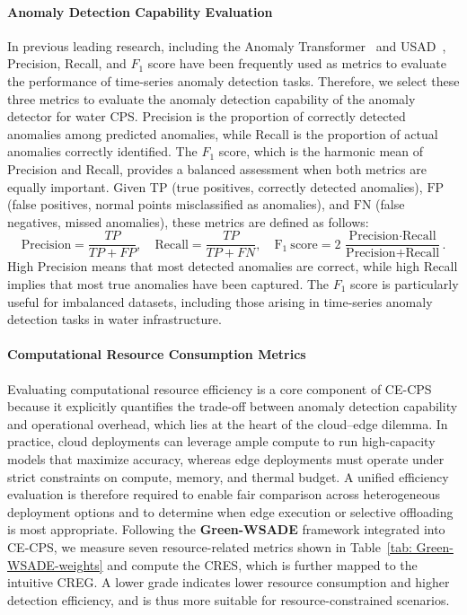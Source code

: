 \documentclass[pdflatex,sn-mathphys-num]{sn-jnl}%
\theoremstyle{thmstyleone}
\theoremstyle{thmstyletwo}%
\theoremstyle{thmstylethree}%
\begin{document}
\paragraph{Anomaly Detection Capability Evaluation}
In previous leading research, including the Anomaly Transformer~\cite{xu2022anomaly} and USAD~\cite{audibert2020usad}, Precision, Recall, and $F_1$ score have been frequently used as metrics to evaluate the performance of time-series anomaly detection tasks.
Therefore, we select these three metrics to evaluate the anomaly detection capability of the anomaly detector for water CPS. Precision is the proportion of correctly detected anomalies among predicted anomalies, while Recall is the proportion of actual anomalies correctly identified.
The $F_1$ score, which is the harmonic mean of Precision and Recall, provides a balanced assessment when both metrics are equally important.
Given $\mathrm{TP}$ (true positives, correctly detected anomalies), $\mathrm{FP}$ (false positives, normal points misclassified as anomalies), and $\mathrm{FN}$ (false negatives, missed anomalies), these metrics are defined as follows:
\begin{equation}
\text{Precision} = \frac{TP}{TP+FP}, \quad \text{Recall} = \frac{TP}{TP+FN},\quad \text{F}_1\ \text{score} = 2\,\frac{\text{Precision}\cdot \text{Recall}}{\text{Precision}+\text{Recall}}.
\end{equation}
High Precision means that most detected anomalies are correct, while high Recall implies that most true anomalies have been captured. The $F_1$ score is particularly useful for imbalanced datasets, including those arising in time-series anomaly detection tasks in water infrastructure.

\paragraph{Computational Resource Consumption Metrics}
Evaluating computational resource efficiency is a core component of \textsc{CE-CPS} because it explicitly quantifies the trade-off between anomaly detection capability and operational overhead, which lies at the heart of the cloud--edge dilemma. In practice, cloud deployments can leverage ample compute to run high-capacity models that maximize accuracy, whereas edge deployments must operate under strict constraints on compute, memory, and thermal budget. A unified efficiency evaluation is therefore required to enable fair comparison across heterogeneous deployment options and to determine when edge execution or selective offloading is most appropriate. Following the \textbf{Green-WSADE} framework integrated into \textsc{CE-CPS}, we measure seven resource-related metrics shown in Table~\ref{tab: Green-WSADE-weights} and compute the CRES, which is further mapped to the intuitive CREG. A lower grade indicates lower resource consumption and higher detection efficiency, and is thus more suitable for resource-constrained scenarios.
\end{document}
